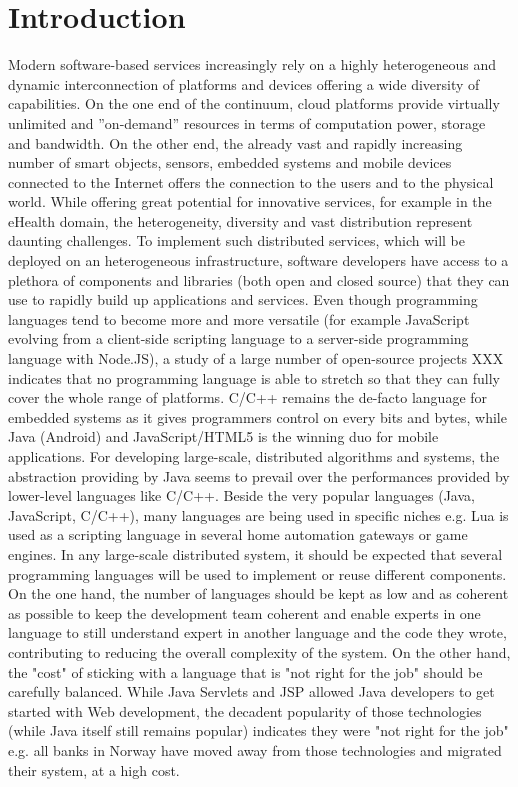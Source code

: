 \section{Introduction}

Modern software-based services increasingly rely on a highly heterogeneous and dynamic interconnection of platforms and devices offering a wide diversity of capabilities. On the one end of the continuum, cloud platforms provide virtually unlimited and ”on-demand” resources in terms of computation power, storage and bandwidth. On the other end, the already vast and rapidly increasing number of smart objects, sensors, embedded systems and mobile devices connected to the Internet offers the connection to the users and to the physical world. While offering great potential for innovative services, for example in the eHealth domain, the heterogeneity, diversity and vast distribution represent daunting challenges. 
To implement such distributed services, which will be deployed on an heterogeneous infrastructure, software developers have access to a plethora of components and libraries (both open and closed source) that they can use to rapidly build up applications and services. Even though programming languages tend to become more and more versatile (for example JavaScript evolving from a client-side scripting language to a server-side programming language with Node.JS), a study of a large number of open-source projects XXX indicates that no programming language is able to stretch so that they can fully cover the whole range of platforms. C/C++ remains the de-facto language for embedded systems as it gives programmers control on every bits and bytes, while Java (Android) and JavaScript/HTML5 is the winning duo for mobile applications. For developing large-scale, distributed algorithms and systems, the abstraction providing by Java seems to prevail over the performances provided by lower-level languages like C/C++. Beside the very popular languages (Java, JavaScript, C/C++), many languages are being used in specific niches e.g. Lua is used as a scripting language in several home automation gateways or game engines. 
In any large-scale distributed system, it should be expected that several programming languages will be used to implement or reuse different components. On the one hand, the number of languages should be kept as low and as coherent as possible to keep the development team coherent and enable experts in one language to still understand expert in another language and the code they wrote, contributing to reducing the overall complexity of the system. On the other hand, the "cost" of sticking with a language that is "not right for the job" should be carefully balanced. While Java Servlets and JSP allowed Java developers to get started with Web development, the decadent popularity of those technologies (while Java itself still remains popular) indicates they were "not right for the job" e.g. all banks in Norway have moved away from those technologies and migrated their system, at a high cost. 
